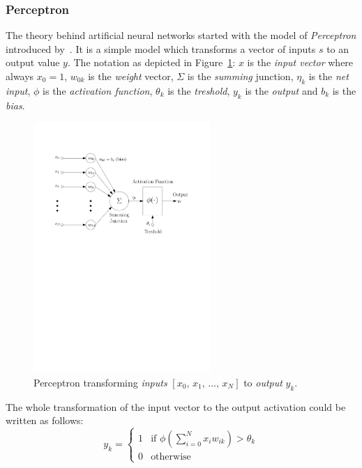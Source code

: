\subsubsection{Perceptron}
\label{sec:models-perceptron}

The theory behind artificial neural networks started with the model of \emph{Perceptron} introduced by~\citet{mcculloch1943logical}. It is a simple model which transforms a vector of inputs $s$ to an output value $y$. The notation as depicted in Figure~\ref{fig:perceptron}: $x$ is the \emph{input vector} where always $x_0=1$, $w_{0k}$ is the \emph{weight} vector, $\Sigma$ is the \emph{summing} junction, $\eta_k$ is the \emph{net input}, $\phi$ is the \emph{activation function}, $\theta_k$ is the \emph{treshold}, $y_k$ is the \emph{output} and $b_k$ is the \emph{bias}.

\begin{figure}[H]
  \centering
  \includegraphics[width=0.6\textwidth]{img/perceptron.pdf}    
  \caption{Perceptron transforming \emph{inputs} $[x_0,\, x_1,\, \ldots,\, x_N]$ to \emph{output} $y_k$.} 
  \label{fig:perceptron}
\end{figure}

The whole transformation of the input vector to the output activation could be written as follows: 
\begin{equation}
\label{eq:perceptron} 
y_k =
\left\{
	\begin{array}{ll}
		1 & \mbox{if } \phi(\sum_{i=0}^N x_iw_{ik}) > \theta_k \\
		0 & \mbox{otherwise}
	\end{array}
\right.
\end{equation} 

